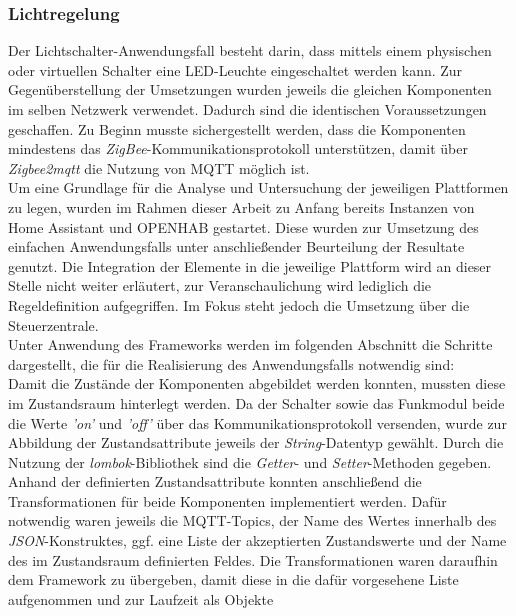     \subsubsection*{Lichtregelung}
    Der Lichtschalter-Anwendungsfall besteht darin, dass mittels einem physischen oder virtuellen Schalter eine LED-Leuchte eingeschaltet werden kann. Zur 
    Gegenüberstellung der Umsetzungen wurden jeweils die gleichen Komponenten im selben Netzwerk verwendet. Dadurch sind die identischen Voraussetzungen geschaffen. 
    Zu Beginn musste sichergestellt werden, dass die Komponenten mindestens das \textit{ZigBee}-Kommunikationsprotokoll unterstützen, damit über \textit{Zigbee2mqtt} 
    die Nutzung von \acs{MQTT} möglich ist. 
    \\
    Um eine Grundlage für die Analyse und Untersuchung der jeweiligen Plattformen zu legen, wurden im Rahmen dieser Arbeit zu Anfang bereits Instanzen von Home Assistant und 
    \acs{OPENHAB} gestartet. Diese wurden zur Umsetzung des einfachen Anwendungsfalls unter anschließender Beurteilung der Resultate genutzt. 
    Die Integration der Elemente in die jeweilige Plattform wird an dieser Stelle nicht weiter erläutert, zur Veranschaulichung wird 
    lediglich die Regeldefinition aufgegriffen. Im Fokus steht jedoch die Umsetzung über die Steuerzentrale.
    \\
    \linebreak
    Unter Anwendung des Frameworks werden im folgenden Abschnitt die Schritte dargestellt, die für die Realisierung des Anwendungsfalls notwendig sind: 
    \\
    Damit die Zustände der Komponenten abgebildet werden konnten, mussten diese im Zustandsraum hinterlegt werden. Da der Schalter sowie das Funkmodul 
    beide die Werte \textit{'on'} und \textit{'off'} über das Kommunikationsprotokoll versenden, wurde zur Abbildung der Zustandsattribute jeweils der \textit{String}-Datentyp gewählt. 
    Durch die Nutzung der \textit{lombok}-Bibliothek sind die \textit{Getter}- und \textit{Setter}-Methoden gegeben. 
    \\
    Anhand der definierten Zustandsattribute konnten anschließend die Transformationen für beide Komponenten implementiert werden. Dafür notwendig waren jeweils 
    die \acs{MQTT}-Topics, der Name des Wertes innerhalb des \textit{JSON}-Konstruktes, ggf. eine Liste der akzeptierten Zustandswerte und der Name des im Zustandsraum 
    definierten Feldes. Die Transformationen waren daraufhin dem Framework zu übergeben, damit diese in die dafür vorgesehene Liste aufgenommen und zur Laufzeit als Objekte 
